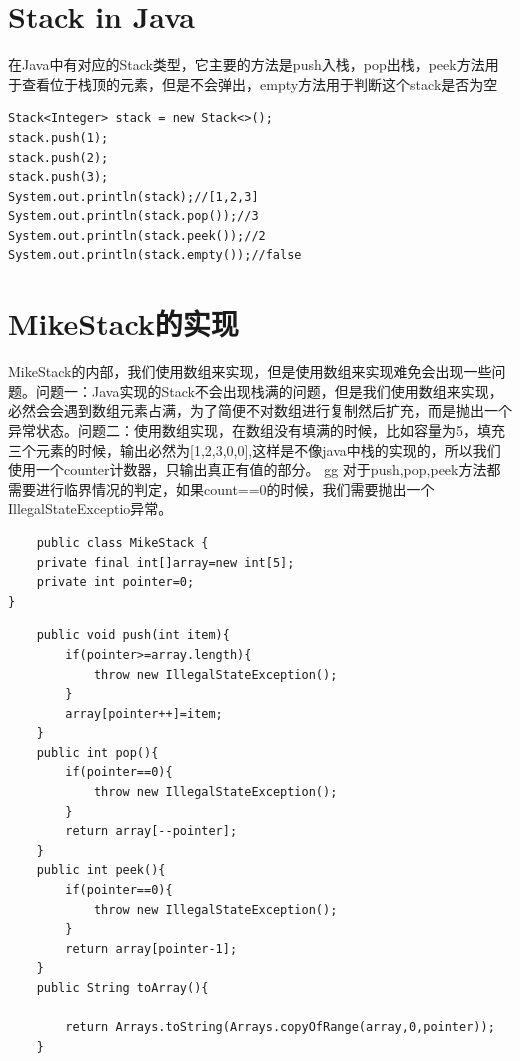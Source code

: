 \documentclass[
	11pt,
	fleqn,
	a4paper,
]{LegrandOrangeBook}
\begin{document}
\section{Stack in Java}
在Java中有对应的Stack类型，它主要的方法是push入栈，pop出栈，peek方法用于查看位于栈顶的元素，但是不会弹出，empty方法用于判断这个stack是否为空
\begin{verbatim}
Stack<Integer> stack = new Stack<>();
stack.push(1);
stack.push(2);
stack.push(3);
System.out.println(stack);//[1,2,3]
System.out.println(stack.pop());//3
System.out.println(stack.peek());//2
System.out.println(stack.empty());//false
\end{verbatim}
\section{MikeStack的实现}
MikeStack的内部，我们使用数组来实现，但是使用数组来实现难免会出现一些问题。问题一：Java实现的Stack不会出现栈满的问题，但是我们使用数组来实现，必然会会遇到数组元素占满，为了简便不对数组进行复制然后扩充，而是抛出一个异常状态。问题二：使用数组实现，在数组没有填满的时候，比如容量为5，填充三个元素的时候，输出必然为[1,2,3,0,0],这样是不像java中栈的实现的，所以我们使用一个counter计数器，只输出真正有值的部分。
gg
对于push,pop,peek方法都需要进行临界情况的判定，如果count==0的时候，我们需要抛出一个IllegalStateExceptio异常。

\begin{verbatim}
    public class MikeStack {
    private final int[]array=new int[5];
    private int pointer=0;
}
\end{verbatim}
\begin{verbatim}
    public void push(int item){
        if(pointer>=array.length){
            throw new IllegalStateException();
        }
        array[pointer++]=item;
    }
    public int pop(){
        if(pointer==0){
            throw new IllegalStateException();
        }
        return array[--pointer];
    }
    public int peek(){
        if(pointer==0){
            throw new IllegalStateException();
        }
        return array[pointer-1];
    }
    public String toArray(){

        return Arrays.toString(Arrays.copyOfRange(array,0,pointer));
    }
\end{verbatim}
\end{document}
